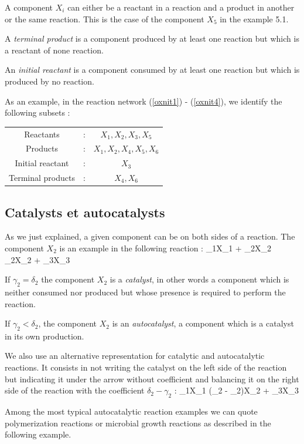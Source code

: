 A component $X_i$ can either be a reactant in a reaction and a product in another or the same reaction.
This is the case of the component $X_5$ in the example 5.1.

A {\em terminal product} is a component produced by at least one reaction but which is a reactant of none reaction.

An {\em initial reactant} is a component consumed by at least one reaction but which is produced by no reaction.

As an example, in the reaction network (\ref{oxnit1}) - (\ref{oxnit4}),
we identify the following subsets : 

\begin{tabular}{ccc}
Reactants & : & $X_1, X_2, X_3, X_5$ \\
Products  & : & $X_1, X_2, X_4, X_5, X_6$ \\
Initial reactant & : & $X_3$ \\
Terminal products & : & $X_4, X_6$ \\
\end{tabular}

\subsection* {Catalysts et autocatalysts}

As we just explained, a given component can be on both sides of a reaction.
The component $X_2$ is an example in the following reaction :
\eqnn \gamma_1X_1 + \gamma_2X_2 \longrightarrow \delta_2X_2 + \delta_3X_3 \eeqnn 

If $\gamma_2 = \delta_2$ the component $X_2$ is a {\em catalyst}, in other words a component which is neither consumed nor produced but whose presence is required to perform the reaction.

If $\gamma_2 < \delta_2$, the component $X_2$ is an {\em autocatalyst},
a component which is a catalyst in its own production.

We also use an alternative representation for catalytic and autocatalytic reactions.
It consists in not writing the catalyst on the left side of the reaction
but indicating it under the arrow without coefficient 
and balancing it on the right side of the reaction with the coefficient $\delta_2 - \gamma_2$ :
\eqnn \gamma_1X_1   (\delta_2 - \gamma_2)X_2 + \delta_3X_3 \eeqnn 

Among the most typical autocatalytic reaction examples we can quote 
polymerization reactions or microbial growth reactions as described in the following example.

